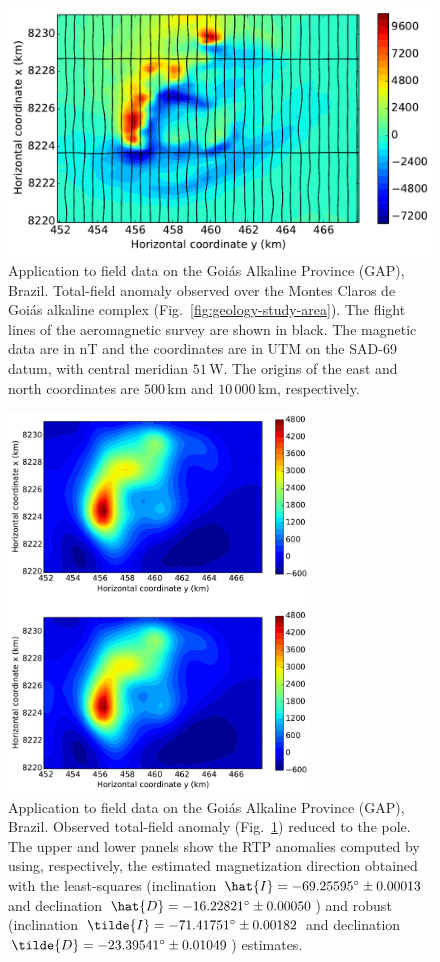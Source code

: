 \documentclass[journal abbreviation, npg]{copernicus}
\begin{document}
\clearpage

\begin{figure}[t]
  \includegraphics[width=120mm]{Figures/npgd-2014-0069-f16}
  \caption{Application to field data on the Goi\'{a}s Alkaline Province
    (GAP), Brazil. Total-field anomaly observed over the Montes Claros
    de Goi\'{a}s alkaline complex
    (Fig.~\ref{fig:geology-study-area}). The flight lines of the
    aeromagnetic survey are shown in black. The magnetic data are in nT
    and the coordinates are in UTM on the SAD-69 datum, with central
    meridian $51${\degree}\,W. The origins of the east and north
    coordinates are $500$\,\unit{km} and $10\,000$\,\unit{km},
    respectively. }
\label{fig:TFA-MCG}
\end{figure}

\clearpage

\begin{figure}[t]
\includegraphics[width=80mm]{Figures/npgd-2014-0069-f17}
\caption{Application to field data on the Goi\'{a}s Alkaline Province
  (GAP), Brazil. Observed total-field anomaly (Fig.~\ref{fig:TFA-MCG})
  reduced to the pole. The upper and lower panels show the RTP
  anomalies computed by using, respectively, the estimated
  magnetization direction obtained with the least-squares (inclination
  $\hat{I} = -69.25595{\degree} \pm 0.00013${\degree} and declination
  $\hat{D} = -16.22821{\degree} \pm 0.00050${\degree}) and robust
  (inclination $\tilde{I} = -71.41751{\degree} \pm 0.00182${\degree}
  and declination $\tilde{D} = -23.39541{\degree} \pm
  0.01049${\degree}) estimates. }
\label{fig:TFA-MCG-RTP}
\end{figure}
\end{document}

